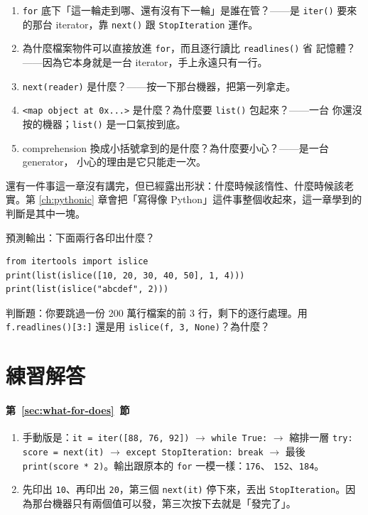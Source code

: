 \begin{enumerate}
\item \texttt{for} 底下「這一輪走到哪、還有沒有下一輪」是誰在管？——是 \texttt{iter()}
要來的那台 iterator，靠 \texttt{next()} 跟 \texttt{StopIteration} 運作。
\item 為什麼檔案物件可以直接放進 \texttt{for}，而且逐行讀比 \texttt{readlines()} 省
記憶體？——因為它本身就是一台 iterator，手上永遠只有一行。
\item \texttt{next(reader)} 是什麼？——按一下那台機器，把第一列拿走。
\item \texttt{<map object at 0x...>} 是什麼？為什麼要 \texttt{list()} 包起來？——一台
你還沒按的機器；\texttt{list()} 是一口氣按到底。
\item comprehension 換成小括號拿到的是什麼？為什麼要小心？——是一台 generator，
小心的理由是它只能走一次。
\end{enumerate}

還有一件事這一章沒有講完，但已經露出形狀：什麼時候該惰性、什麼時候該老實。第
\ref{ch:pythonic} 章會把「寫得像 Python」這件事整個收起來，這一章學到的判斷是其中一塊。

\begin{drills}[label=drills:itertools-peek]
\item 預測輸出：下面兩行各印出什麼？
\begin{verbatim}
from itertools import islice
print(list(islice([10, 20, 30, 40, 50], 1, 4)))
print(list(islice("abcdef", 2)))
\end{verbatim}
\item 判斷題：你要跳過一份 200 萬行檔案的前 3 行，剩下的逐行處理。用
\texttt{f.readlines()[3:]} 還是用 \texttt{islice(f, 3, None)}？為什麼？
\end{drills}

\section*{練習解答}

\paragraph{第~\ref{sec:what-for-does}~節}
\begin{enumerate}
\item 手動版是：\texttt{it = iter([88, 76, 92])} $\to$ \texttt{while True:} $\to$ 縮排一層
\texttt{try: score = next(it)} $\to$ \texttt{except StopIteration: break} $\to$ 最後
\texttt{print(score * 2)}。輸出跟原本的 \texttt{for} 一模一樣：\texttt{176}、
\texttt{152}、\texttt{184}。
\item 先印出 \texttt{10}、再印出 \texttt{20}，第三個 \texttt{next(it)} 停下來，丟出
\texttt{StopIteration}。因為那台機器只有兩個值可以發，第三次按下去就是「發完了」。
\end{enumerate}

